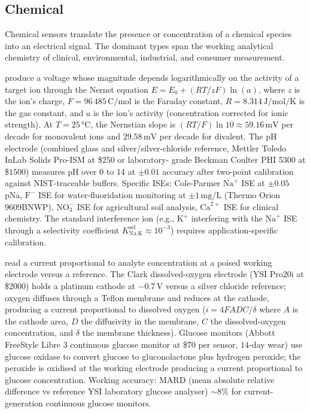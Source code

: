 \subsection{Chemical}

Chemical sensors translate the presence or concentration of a
chemical species into an electrical signal. The dominant types
span the working analytical chemistry of clinical, environmental,
industrial, and consumer measurement.

 produce a voltage whose
magnitude depends logarithmically on the activity of a target
ion through the Nernst equation $E = E_{0} + (RT/zF)\ln(a)$,
where $z$ is the ion's charge, $F = 96\,485\,\si{\coulomb\per
\mol}$ is the Faraday constant, $R = 8.314\,\si{\joule\per\mol
\per\kelvin}$ is the gas constant, and $a$ is the ion's activity
(concentration corrected for ionic strength). At $T = 25\,\si{
\degreeCelsius}$, the Nernstian slope is $(RT/F)\ln 10 \approx
59.16\,\si{\milli\volt}$ per decade for monovalent ions and
$29.58\,\si{\milli\volt}$ per decade for divalent. The pH
electrode (combined glass and silver/silver-chloride reference,
Mettler Toledo InLab Solids Pro-ISM at \$$250$ or laboratory-
grade Beckman Coulter PHI 5300 at \$$1500$) measures pH over $0$
to $14$ at $\pm 0.01$ accuracy after two-point calibration
against NIST-traceable buffers. Specific ISEs: Cole-Parmer
$\mathrm{Na}^{+}$ ISE at $\pm 0.05$ pNa, $\mathrm{F}^{-}$ ISE for
water-fluoridation monitoring at $\pm 1\,\si{\milli\gram\per
\liter}$ (Thermo Orion 9609BNWP), $\mathrm{NO}_{3}^{-}$ ISE for
agricultural soil analysis, $\mathrm{Ca}^{2+}$ ISE for clinical
chemistry. The standard interference ion (e.g., $\mathrm{K}^{+}$
interfering with the $\mathrm{Na}^{+}$ ISE through a selectivity
coefficient $K_{\text{Na,K}}^{\text{sel}} \approx 10^{-3}$)
requires application-specific calibration.

 read a current
proportional to analyte concentration at a poised working
electrode versus a reference. The Clark dissolved-oxygen electrode
(YSI Pro20i at \$$2000$) holds a platinum cathode at $-0.7\,\si{
\volt}$ versus a silver chloride reference; oxygen diffuses
through a Teflon membrane and reduces at the cathode, producing
a current proportional to dissolved oxygen ($i = 4FAD C/\delta$
where $A$ is the cathode area, $D$ the diffusivity in the
membrane, $C$ the dissolved-oxygen concentration, and $\delta$ the
membrane thickness). Glucose monitors (Abbott FreeStyle Libre 3
continuous glucose monitor at \$$70$ per sensor, $14$-day wear)
use glucose oxidase to convert glucose to gluconolactone plus
hydrogen peroxide; the peroxide is oxidised at the working
electrode producing a current proportional to glucose
concentration. Working accuracy: MARD (mean absolute relative
difference vs reference YSI laboratory glucose analyser)
$\sim 8\%$ for current-generation continuous glucose monitors.

